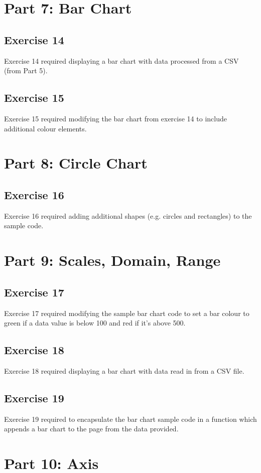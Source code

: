 \documentclass[11pt]{article}   	%
\begin{document}
\section{Part 7: Bar Chart}
\subsection{Exercise 14 }
Exercise 14 required displaying a bar chart with data processed from a CSV (from Part 5).

\subsection{Exercise 15 }
Exercise 15 required modifying the bar chart from exercise 14 to include additional colour elements.  

\section{Part 8: Circle Chart}
\subsection{Exercise 16 }
Exercise 16 required adding additional shapes (e.g. circles and rectangles) to the sample code. 


\section{ Part 9: Scales, Domain, Range }
\subsection{Exercise 17 }
Exercise 17 required modifying the sample bar chart code to set a bar colour to green if a data value is below 100 and red if it's above 500.

\subsection{ Exercise 18 }
Exercise 18 required displaying a bar chart with data read in from a CSV file. 


\subsection{ Exercise 19 }
Exercise 19 required to encapsulate the bar chart sample code in a function which appends a bar chart to the page from the data provided.

\section{Part 10: Axis}
\end{document}
